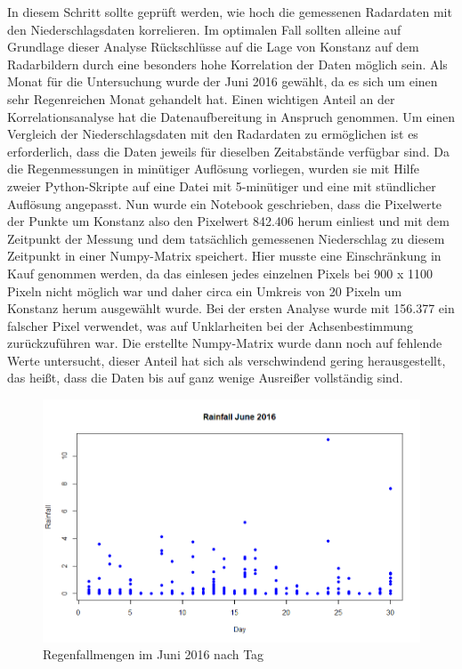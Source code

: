 In diesem Schritt sollte geprüft werden, wie hoch die gemessenen Radardaten mit den Niederschlagsdaten korrelieren. Im optimalen Fall sollten alleine auf Grundlage dieser Analyse Rückschlüsse auf die Lage von Konstanz auf dem Radarbildern durch eine besonders hohe Korrelation der Daten möglich sein. Als Monat für die Untersuchung wurde der Juni 2016 gewählt, da es sich um einen sehr Regenreichen Monat gehandelt hat.
Einen wichtigen Anteil an der Korrelationsanalyse hat die Datenaufbereitung in Anspruch genommen. Um einen Vergleich der Niederschlagsdaten mit den Radardaten zu ermöglichen ist es erforderlich, dass die Daten jeweils für dieselben Zeitabstände verfügbar sind. Da die Regenmessungen in minütiger Auflösung vorliegen, wurden sie mit Hilfe zweier Python-Skripte auf eine Datei mit 5-minütiger und eine mit stündlicher Auflösung angepasst. Nun wurde ein Notebook geschrieben, dass die Pixelwerte der Punkte um Konstanz also den Pixelwert 842.406 herum einliest und mit dem Zeitpunkt der Messung und dem tatsächlich gemessenen Niederschlag zu diesem Zeitpunkt in einer Numpy-Matrix speichert. Hier musste eine Einschränkung in Kauf genommen werden, da das einlesen jedes einzelnen Pixels bei 900 x 1100 Pixeln nicht möglich war und daher circa ein Umkreis von 20 Pixeln um Konstanz herum ausgewählt wurde. Bei der ersten Analyse wurde mit 156.377 ein falscher Pixel verwendet, was auf Unklarheiten bei der Achsenbestimmung zurückzuführen war. Die erstellte Numpy-Matrix wurde dann noch auf fehlende Werte untersucht, dieser Anteil hat sich als verschwindend gering herausgestellt, das heißt, dass die Daten bis auf ganz wenige Ausreißer vollständig sind. 
\begin{figure}[ht]
\centering
\includegraphics[width=\linewidth]{pics/plot_rainfall_day}
\caption{Regenfallmengen im Juni 2016 nach Tag}
\label{fig:Rainfall}
\end{figure}
